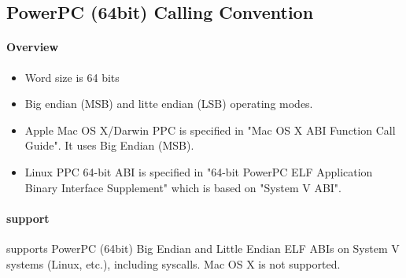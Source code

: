 %
%
%
%

\subsection{PowerPC (64bit) Calling Convention}

\paragraph{Overview}

\begin{itemize}
\item Word size is 64 bits
\item Big endian (MSB) and litte endian (LSB) operating modes.
\item Apple Mac OS X/Darwin PPC is specified in "Mac OS X ABI Function Call Guide"\cite{ppcMacOSX}. It uses Big Endian (MSB).
\item Linux PPC 64-bit ABI is specified in "64-bit PowerPC ELF Application Binary Interface Supplement"\cite{ppcelf64abi} which is based on "System V ABI".
\end{itemize}

\paragraph{ support}

 supports PowerPC (64bit) Big Endian and Little Endian ELF ABIs on System V systems (Linux, etc.), including syscalls. Mac OS X is not supported.


